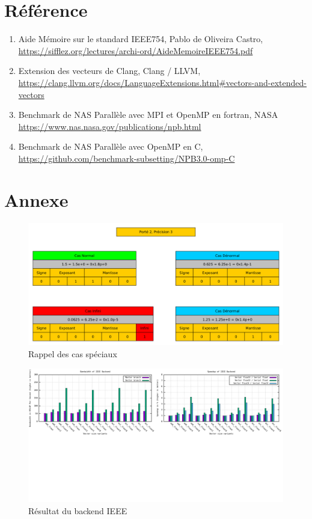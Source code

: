 \documentclass[11pt, letterpaper]{article}
\begin{document}
\section{Référence}
\label{sec:orga1013cc}

\begin{enumerate}
\item \label{orgba3d930} Aide Mémoire sur le standard IEEE754, Pablo de Oliveira Castro,
\url{https://sifflez.org/lectures/archi-ord/AideMemoireIEEE754.pdf}
\item \label{org9e56591} Extension des vecteurs de Clang, Clang / LLVM,
\url{https://clang.llvm.org/docs/LanguageExtensions.html\#vectors-and-extended-vectors}
\item Benchmark de NAS Parallèle avec MPI et OpenMP en fortran, NASA
\url{https://www.nas.nasa.gov/publications/npb.html}
\item Benchmark de NAS Parallèle avec OpenMP en C,
\url{https://github.com/benchmark-subsetting/NPB3.0-omp-C}
\end{enumerate}

\section{Annexe}
\label{sec:orgeeaefde}

\label{org6f8975f}
\begin{figure}[htbp]
\centering
\includegraphics[width=450px]{../ressources/special_case.png}
\caption{\label{fig:org8de9cef}Rappel des cas spéciaux}
\end{figure}

\label{orgad030cd}
\begin{figure}[htbp]
\centering
\includegraphics[width=450px]{../ressources/vm_ieee.png}
\caption{\label{fig:orgb7913e0}Résultat du backend IEEE}
\end{figure}
\end{document}
